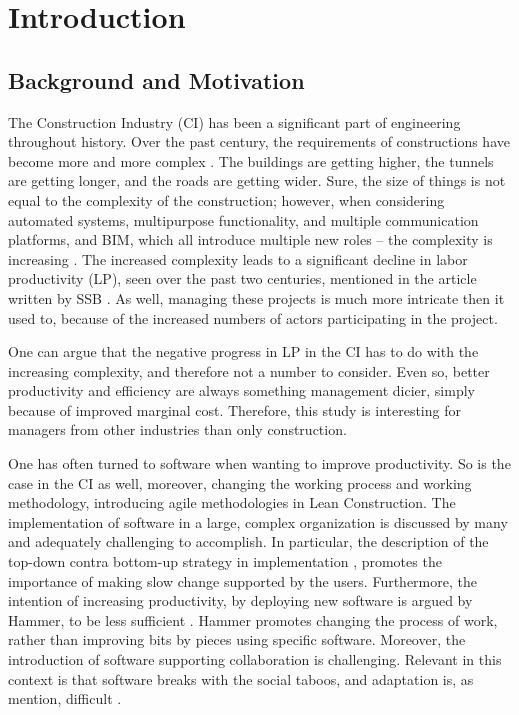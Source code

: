 \chapter{Introduction}

\section{Background and Motivation} \label{sec:background}
The Construction Industry (CI) has been a significant part of engineering throughout history. Over the past century, the requirements of constructions have become more and more complex \citep{wood2009factors}. The buildings are getting higher, the tunnels are getting longer, and the roads are getting wider. Sure, the size of things is not equal to the complexity of the construction; however, when considering automated systems, multipurpose functionality, and multiple communication platforms, and BIM, which all introduce multiple new roles – the complexity is increasing \citep{arayici2010building}. The increased complexity leads to a significant decline in labor productivity (LP), seen over the past two centuries, mentioned in the article written by SSB \citep{productivity}. As well, managing these projects is much more intricate then it used to, because of the increased numbers of actors participating in the project.  
 
One can argue that the negative progress in LP in the CI has to do with the increasing complexity, and therefore not a number to consider. Even so, better productivity and efficiency are always something management dicier, simply because of improved marginal cost. Therefore, this study is interesting for managers from other industries than only construction.
 
One has often turned to software when wanting to improve productivity. So is the case in the CI as well, moreover, changing the working process and working methodology, introducing agile methodologies in Lean Construction. The implementation of software in a large, complex organization is discussed by many and adequately challenging to accomplish. In particular, the description of the top-down contra bottom-up strategy in implementation \citep{Robey&Sahay}, promotes the importance of making slow change supported by the users. Furthermore, the intention of increasing productivity, by deploying new software is argued by Hammer, to be less sufficient \citep{hammer1990reengineering}. Hammer promotes changing the process of work, rather than improving bits by pieces using specific software. Moreover, the introduction of software supporting collaboration is challenging. Relevant in this context is that software breaks with the social taboos, and adaptation is, as mention, difficult \citep{Grudin}. 
 
